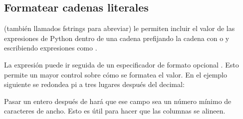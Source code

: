 \documentclass[a5paper,10pt,spanish]{sphinxmanual}
\begin{document}
\subsection{Formatear cadenas literales}
\label{\detokenize{tutorial/inputoutput:formatted-string-literals}}\label{\detokenize{tutorial/inputoutput:tut-f-strings}}
\sphinxAtStartPar
{} (también llamados f\sphinxhyphen{}strings para abreviar) le permiten incluir el valor de las expresiones de Python dentro de una cadena prefijando la cadena con  o  y escribiendo expresiones como .

\sphinxAtStartPar
La expresión puede ir seguida de un especificador de formato opcional . Esto permite un mayor control sobre cómo se formatea el valor. En el ejemplo siguiente se redondea pi a tres lugares después del decimal:

\begin{sphinxVerbatim}[commandchars=\\\{\}]
 
\end{sphinxVerbatim}

\sphinxAtStartPar
Pasar un entero después de  hará que ese campo sea un número mínimo de caracteres de ancho. Esto es útil para hacer que las columnas se alineen.

\begin{sphinxVerbatim}[commandchars=\\\{\}]
       
    
    
\end{sphinxVerbatim}
\end{document}

